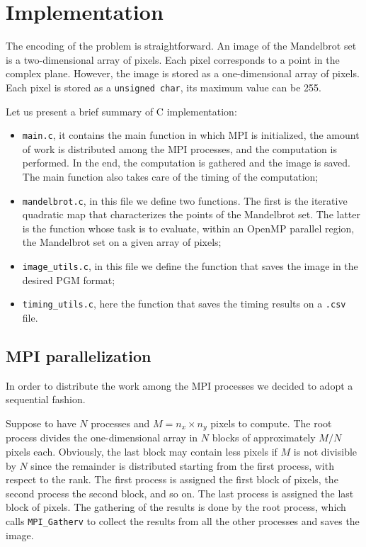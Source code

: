 \section{Implementation}

The encoding of the problem is straightforward. An image of the Mandelbrot set is a two-dimensional array of pixels. Each pixel corresponds to a point in the complex plane. However, the image is stored as a one-dimensional array of pixels. Each pixel is stored as a \texttt{unsigned char}, its maximum value can be 255.

Let us present a brief summary of C implementation:
\begin{itemize}
    \item \texttt{main.c}, it contains the main function in which MPI is initialized, the amount of work is distributed among the MPI processes, and the computation is performed. In the end, the computation is gathered and the image is saved. The main function also takes care of the timing of the computation;
    \item \texttt{mandelbrot.c}, in this file we define two functions. The first is the iterative quadratic map that characterizes the points of the Mandelbrot set. The latter is  the function whose task is to evaluate, within an OpenMP parallel region, the Mandelbrot set on a given array of pixels;
    \item \texttt{image\_utils.c}, in this file we define the function that saves the image in the desired PGM format;
    \item \texttt{timing\_utils.c}, here the function that saves the timing results on a \texttt{.csv} file.
\end{itemize}

\subsection{MPI parallelization}

In order to distribute the work among the MPI processes we decided to adopt a sequential fashion.

Suppose to have $N$ processes and $M = n_x \times n_y$ pixels to compute. The root process divides the one-dimensional array in $N$ blocks of approximately $M/N$ pixels each. Obviously, the last block may contain less pixels if $M$ is not divisible by $N$ since the remainder is distributed starting from the first process, with respect to the rank. The first process is assigned the first block of pixels, the second process the second block, and so on. The last process is assigned the last block of pixels. The gathering of the results is done by the root process, which calls \texttt{MPI\_Gatherv} to collect the results from all the other processes and saves the image.

